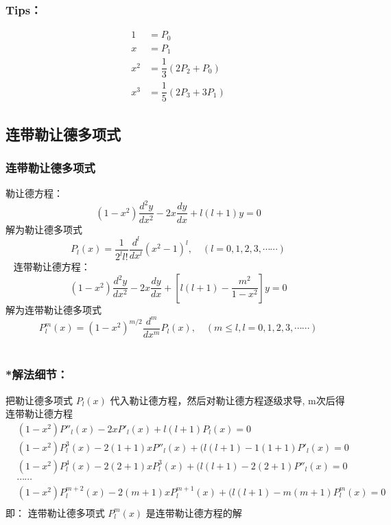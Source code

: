 \begin{frame}
	\frametitle{Tips：}	
	\begin{equation*}
		\begin{split}
		1&= P_0 \\
		x&=P_1\\
	    x^2&=\dfrac{1}{3}(2P_2+P_0)\\
		x^3&=\dfrac{1}{5}(2P_3+3P_1)		
		\end{split}
	\end{equation*}
\end{frame}	

\subsection{连带勒让德多项式}

\begin{frame}
	\frametitle{连带勒让德多项式}
	勒让德方程：
	\begin{equation*}
		\left(1-x^{2}\right) \frac{d^{2} y}{d x^{2}}-2 x \frac{d y}{d x}+l(l+1)y=0
	\end{equation*}		
	解为勒让德多项式
	\begin{equation*}
		P_{l}(x)=\frac{1}{2^{l} l !} \frac{d^{l}}{d x^{l}}\left(x^{2}-1\right)^{l}, \quad(l=0,1,2,3, \cdots \cdots)
	\end{equation*}	 
	连带勒让德方程：
	\begin{equation*}
		\left(1-x^{2}\right) \frac{d^{2} y}{d x^{2}}-2 x \frac{d y}{d x}+\left[l(l+1)-\frac{m^{2}}{1-x^{2}}\right] y=0
	\end{equation*}		
	解为连带勒让德多项式
	\begin{equation*}
		P^m  _{l}(x)= (1-x^2) ^ {m/2 } \frac{d^{m}}{d x^{m} } P_l(x),  \quad(m \le l, l=0,1,2,3, \cdots \cdots)
	\end{equation*}	 
\end{frame}	

\begin{frame}
	\frametitle{*解法细节：}
	把勒让德多项式 $P_{l}(x) $ 代入勒让德方程，然后对勒让德方程逐级求导, m次后得连带勒让德方程
	\begin{equation*}
		\begin{split}
			&\left(1-x^{2}\right) P'' _l  (x) -2 x P' _l (x)+l(l+1)P_l(x)=0	\\
			&\left(1-x^{2}\right) P^{3} _l  (x) -2(1+1) x P'' _l (x)+(l(l+1)-1(1+1)P'_l(x)=0	\\
			&\left(1-x^{2}\right) P^{4} _l  (x) -2(2+1) x P^{3} _l (x)+(l(l+1)-2(2+1)P''_l(x)=0	\\
			& \cdots \cdots\\
			&\left(1-x^{2}\right) P^{m+2} _l  (x) -2(m+1) x P^{m+1} _l (x)+(l(l+1)-m(m+1)P^{m} _l(x)=0	\\
		\end{split}
	\end{equation*}
	即： 连带勒让德多项式  $P^{m} _l  (x)  $ 是连带勒让德方程的解
\end{frame}	

